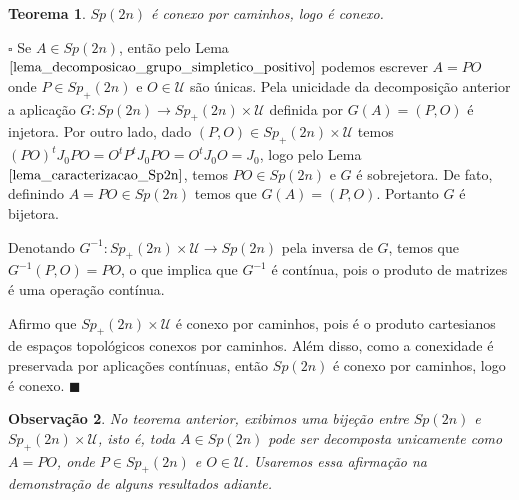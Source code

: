 \documentclass[12pt]{book}
\newtheorem{teorema}{Teorema}[section]
\newtheorem{observacao}[teorema]{Observação}
\newenvironment{prova}[1]{$\square$ #1}{\hfill$\blacksquare$}
\newcommand{\estruturacomplexa}{J_{0}}
\newcommand{\gruposimpletico}[1]{Sp(#1)}
\newcommand{\gruposimpleticopositivo}[1]{Sp_{+}(#1)}
\newcommand{\matrizSimpleticaOrtogonal}{\mathcal{U}}
\begin{document}
	\begin{teorema}\label{teoerma_sp2n_conexo}
		$\gruposimpletico{2n}$ é conexo por caminhos, logo é conexo.
	\end{teorema}
	\begin{prova}
		Se $A \in \gruposimpletico{2n}$, então pelo Lema $\ref{lema_decomposicao_grupo_simpletico_positivo}$ podemos escrever $A=PO$ onde $P \in \gruposimpleticopositivo{2n}$ e $O\in \matrizSimpleticaOrtogonal$ são únicas. Pela unicidade da decomposição anterior a aplicação $G: \gruposimpletico{2n} \to \gruposimpleticopositivo{2n} \times \matrizSimpleticaOrtogonal$ definida por $G(A) = (P,O)$ é injetora. Por outro lado, dado $(P,O) \in \gruposimpleticopositivo{2n} \times \matrizSimpleticaOrtogonal$ temos $(PO)^{t}\estruturacomplexa PO = O^{t}P^{t}\estruturacomplexa PO = O^{t}\estruturacomplexa O = \estruturacomplexa$, logo pelo Lema $\ref{lema_caracterizacao_Sp2n}$, temos $PO \in \gruposimpletico{2n}$ e $G$ é sobrejetora. De fato, definindo $A=PO \in \gruposimpletico{2n}$ temos que $G(A) = (P,O)$. Portanto $G$ é bijetora. 
		
		Denotando $G^{-1}:\gruposimpleticopositivo{2n} \times \matrizSimpleticaOrtogonal\to \gruposimpletico{2n}$ pela inversa de $G$, temos que $G^{-1}(P,O) = PO$, o que implica que $G^{-1}$ é contínua, pois o produto de matrizes é uma operação contínua.
		
		Afirmo que $\gruposimpleticopositivo{2n}\times \matrizSimpleticaOrtogonal$ é conexo por caminhos, pois é o produto cartesianos de espaços topológicos conexos por caminhos. Além disso, como a conexidade é preservada por aplicações contínuas, então $\gruposimpletico{2n}$ é conexo por caminhos, logo é conexo.
	\end{prova}
	
	\begin{observacao}\label{observacao_decomposicao_Sp2n}
		No teorema anterior, exibimos uma bijeção entre $\gruposimpletico{2n} $ e $\gruposimpleticopositivo{2n} \times \matrizSimpleticaOrtogonal$, isto é, toda $A \in \gruposimpletico{2n}$ pode ser decomposta unicamente como $A=PO$, onde $P\in \gruposimpleticopositivo{2n}$ e $O \in \matrizSimpleticaOrtogonal$. Usaremos essa afirmação na demonstração de alguns resultados adiante.
	\end{observacao}
	
\end{document}
